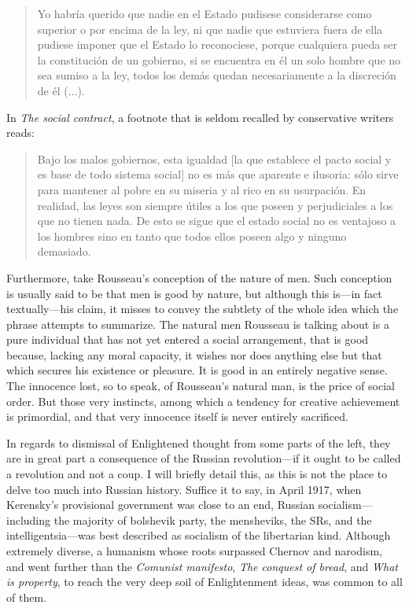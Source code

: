 \documentclass[a4paper]{article}
\begin{document}
\begin{quote}
    Yo habría querido que nadie en el Estado pudisese considerarse como superior
    o por encima de la ley, ni que nadie que estuviera fuera de ella pudiese
    imponer que el Estado lo reconociese, porque cualquiera pueda ser la
    constitución de un gobierno, si se encuentra en él un solo hombre que no sea
    sumiso a la ley, todos los demás quedan necesariamente a la discreción de él
    ($\ldots$).
\end{quote}

In \textit{The social contract}, a footnote that is seldom recalled by
conservative writers reads:

\begin{quote}
    Bajo los malos gobiernos, esta igualdad [la que establece el pacto social y
    es base de todo sistema social] no es más que aparente e ilusoria: sólo
    sirve para mantener al pobre en su miseria y al rico en su usurpación. En
    realidad, las leyes son siempre útiles a los que poseen y perjudiciales a
    los que no tienen nada. De esto se sigue que el estado social no es
    ventajoso a los hombres sino en tanto que todos ellos poseen algo y ninguno
    demasiado.
\end{quote}

Furthermore, take Rousseau's conception of the nature of men. Such conception is
usually said to be that men is good by nature, but although this is---in fact
textually---his claim, it misses to convey the subtlety of the whole idea which
the phrase attempts to summarize. The natural men Rousseau is talking about is a
pure individual that has not yet entered a social arrangement, that is good
because, lacking any moral capacity, it wishes nor does anything else but that
which secures his existence or pleasure. It is good in an entirely negative
sense. The innocence lost, so to speak, of Rousseau's natural man, is the price
of social order. But those very instincts, among which a tendency for creative
achievement is primordial, and that very innocence itself is never entirely
sacrificed.

In regards to dismissal of Enlightened thought from some parts of the left, they
are in great part a consequence of the Russian revolution---if it ought to be
called a revolution and not a coup. I will briefly detail this, as this is not
the place to delve too much into Russian history. Suffice it to say, in April
1917, when Kerensky's provisional government was close to an end, Russian
socialism---including the majority of bolshevik party, the mensheviks, the SRs,
and the intelligentsia---was best described as socialism of the libertarian
kind. Although extremely diverse, a humanism whose roots surpassed Chernov and
narodism, and went further than the \textit{Comunist manifesto}, \textit{The
conquest of bread}, and \textit{What is property}, to reach the very deep soil
of Enlightenment ideas, was common to all of them. 
\end{document}
